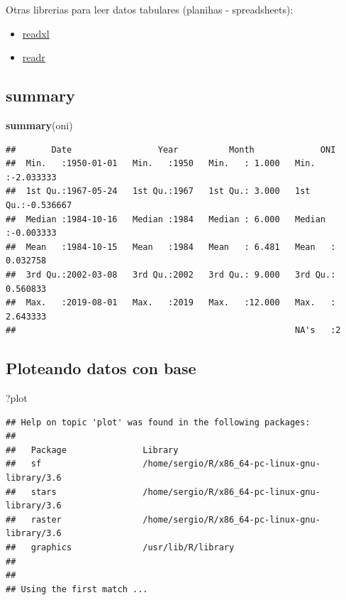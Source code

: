 \documentclass[]{book}
\newenvironment{Shaded}{\begin{snugshade}}{\end{snugshade}}
\newcommand{\KeywordTok}[1]{\textcolor[rgb]{0.13,0.29,0.53}{\textbf{#1}}}
\newcommand{\NormalTok}[1]{#1}
\providecommand{\tightlist}{%
  \setlength{\itemsep}{0pt}\setlength{\parskip}{0pt}}
\begin{document}
Otras librerias para leer datos tabulares (planihas - spreadsheets):

\begin{itemize}
\tightlist
\item
  \href{https://readxl.tidyverse.org/}{readxl}
\item
  \href{https://readr.tidyverse.org/}{readr}
\end{itemize}

\hypertarget{summary}{%
\subsection{summary}\label{summary}}

\begin{Shaded}
\begin{Highlighting}[]
\KeywordTok{summary}\NormalTok{(oni)}
\end{Highlighting}
\end{Shaded}

\begin{verbatim}
##       Date                 Year          Month             ONI           
##  Min.   :1950-01-01   Min.   :1950   Min.   : 1.000   Min.   :-2.033333  
##  1st Qu.:1967-05-24   1st Qu.:1967   1st Qu.: 3.000   1st Qu.:-0.536667  
##  Median :1984-10-16   Median :1984   Median : 6.000   Median :-0.003333  
##  Mean   :1984-10-15   Mean   :1984   Mean   : 6.481   Mean   : 0.032758  
##  3rd Qu.:2002-03-08   3rd Qu.:2002   3rd Qu.: 9.000   3rd Qu.: 0.560833  
##  Max.   :2019-08-01   Max.   :2019   Max.   :12.000   Max.   : 2.643333  
##                                                       NA's   :2
\end{verbatim}

\hypertarget{ploteando-datos-con-base}{%
\subsection{Ploteando datos con base}\label{ploteando-datos-con-base}}

\begin{Shaded}
\begin{Highlighting}[]
\NormalTok{?plot}
\end{Highlighting}
\end{Shaded}

\begin{verbatim}
## Help on topic 'plot' was found in the following packages:
## 
##   Package               Library
##   sf                    /home/sergio/R/x86_64-pc-linux-gnu-library/3.6
##   stars                 /home/sergio/R/x86_64-pc-linux-gnu-library/3.6
##   raster                /home/sergio/R/x86_64-pc-linux-gnu-library/3.6
##   graphics              /usr/lib/R/library
## 
## 
## Using the first match ...
\end{verbatim}
\end{document}

